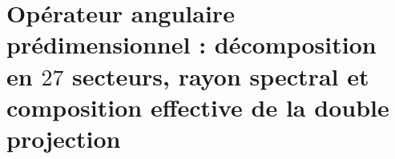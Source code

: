 \chapter{Opérateur angulaire prédimensionnel : décomposition en \(27\) secteurs, rayon spectral et composition effective de la double projection}
\label{chap:p3-final:37:operador_angular}

